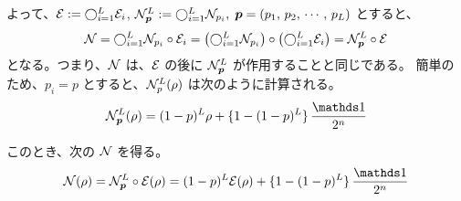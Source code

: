 よって、$\mathcal{E} := \bigcirc_{i=1}^L \mathcal{E}_i$,  $\mathcal{N}_{\boldsymbol{p}}^L := \bigcirc_{i=1}^L \mathcal{N}_{p_i},\; \boldsymbol{p} = (p_1,\,p_2,\,\cdots,\,p_L)$ とすると、
\begin{align}
    \mathcal{N}
    = \bigcirc_{i=1}^L \mathcal{N}_{p_i} \circ \mathcal{E}_i
    = \qty(\bigcirc_{i=1}^L \mathcal{N}_{p_i}) \circ \qty(\bigcirc_{i=1}^L \mathcal{E}_i)
    = \mathcal{N}_{\boldsymbol{p}}^L \circ \mathcal{E}
\end{align}
となる。つまり、$\mathcal{N}$ は、$\mathcal{E}$ の後に $\mathcal{N}_{\boldsymbol{p}}^L$ が作用することと同じである。
簡単のため、$p_i = p$ とすると、$\mathcal{N}_p^L(\rho)$ は次のように計算される。
\begin{align}
    \calN_{\bs{p}}^L(\rho) = (1 - p)^L\rho + \{1 - (1 - p)^L\}\,\frac{\bbid}{2^n}
\end{align}

このとき、次の $\mathcal{N}$ を得る。
\begin{align}
    \calN(\rho)
    = \calN_{\bs{p}}^L \circ \calE(\rho)
    = (1 - p)^L\calE(\rho) + \{1 - (1 - p)^L\}\,\frac{\bbid}{2^n}
\end{align}


